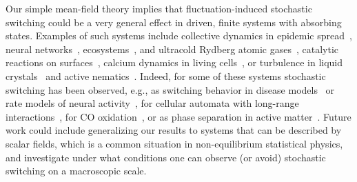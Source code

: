 Our simple mean-field theory implies that fluctuation-induced stochastic switching could be a very general effect in driven, finite systems with absorbing states.
Examples of such systems include collective dynamics in epidemic spread~\cite{pastor-satorras_epidemic_2015}, neural networks~\cite{beggs_neuronal_2003, chialvo_emergent_2010, wilting_25_2019}, ecosystems~\cite{scheffer_critical_2009, martin_eluding_2015}, and ultracold Rydberg atomic gases~\cite{helmrich_signatures_2020}, catalytic reactions on surfaces~\cite{ehsasi_steady_1989}, calcium dynamics in living cells~\cite{bar_discrete_2000}, or turbulence in liquid crystals~\cite{takeuchi_directed_2007, takeuchi_experimental_2009} and active nematics~\cite{doostmohammadi_onset_2017}.
Indeed, for some of these systems stochastic switching has been observed, e.g., as switching behavior in disease models~\cite{bottcher_critical_2017} or rate models of neural activity~\cite{van_meegen_large-deviation_2021}, for cellular automata with long-range interactions~\cite{pizzi_bistability_2021}, for CO oxidation~\cite{ertl_oscillatory_1991, suchorski_role_2018, wang_bistability_2019}, or as phase separation in active matter~\cite{martin_fluctuation-induced_2021, di_carlo_evidence_2022}.
Future work could include generalizing our results to systems that can be described by scalar fields, which is a common situation in non-equilibrium statistical physics, and investigate under what conditions one can observe (or avoid) stochastic switching on a macroscopic scale.



